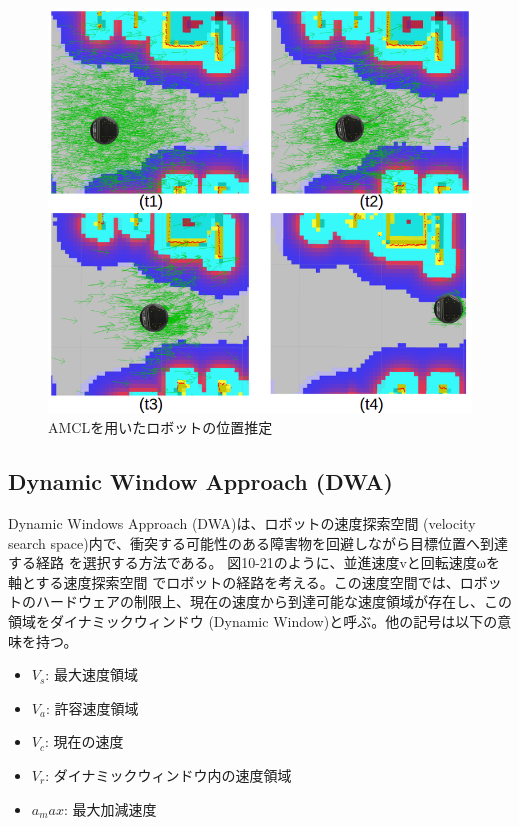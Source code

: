 \begin{figure}[ht]
  \centering
  \includegraphics[width=\columnwidth]{pictures/chapter10/pic_10_20.png}
  \caption{AMCLを用いたロボットの位置推定}
\end{figure}


\subsection{Dynamic Window Approach (DWA)}

Dynamic Windows Approach (DWA)は、ロボットの速度探索空間 (velocity search space)内で、衝突する可能性のある障害物を回避しながら目標位置へ到達する経路  を選択する方法である。
 図10-21のように、並進速度vと回転速度ωを軸とする速度探索空間 でロボットの経路を考える。この速度空間では、ロボットのハードウェアの制限上、現在の速度から到達可能な速度領域が存在し、この領域をダイナミックウィンドウ (Dynamic Window)と呼ぶ。他の記号は以下の意味を持つ。

\begin{itemize}
\item $V_s$: 最大速度領域
\item $V_a$: 許容速度領域
\item $V_c$: 現在の速度
\item $V_r$: ダイナミックウィンドウ内の速度領域
\item $a_max$: 最大加減速度
\end{itemize}

